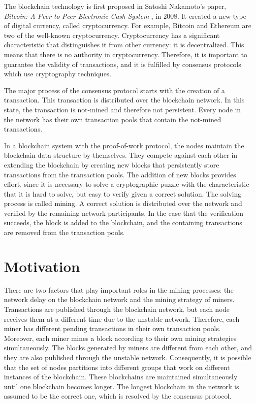 The blockchain technology is first proposed in Satoshi Nakamoto’s paper, \textit{Bitcoin: A Peer-to-Peer Electronic Cash System} \cite{Nakamoto2008}, in 2008. It created a new type of digital currency, called cryptocurrency. For example, Bitcoin \cite{bitcoin} and Ethereum \cite{ethereum} are two of the well-known cryptocurrency. Cryptocurrency has a significant characteristic that distinguishes it from other currency: it is decentralized. This means that there is no authority in cryptocurrency. Therefore, it is important to guarantee the validity of transactions, and it is fulfilled by consensus protocols which use cryptography techniques. \cite{Narayanan2016}

The major process of the consensus protocol starts with the creation of a transaction. This transaction is distributed over the blockchain network. In this state, the transaction is not-mined and therefore not persistent. Every node in the network has their own transaction pools that contain the not-mined transactions.

In a blockchain system with the proof-of-work protocol, the nodes maintain the blockchain data structure by themselves. They compete against each other in extending the blockchain by creating new blocks that persistently store transactions from the transaction pools. The addition of new blocks provides effort, since it is necessary to solve a cryptographic puzzle with the characteristic that it is hard to solve, but easy to verify given a correct solution. The solving process is called mining. A correct solution is distributed over the network and verified by the remaining network participants. In the case that the verification succeeds, the block is added to the blockchain, and the containing transactions are removed from the transaction pools.

\section{Motivation}

There are two factors that play important roles in the mining processes: the network delay on the blockchain network and the mining strategy of miners. Transactions are published through the blockchain network, but each node receives them at a different time due to the unstable network. Therefore, each miner has different pending transactions in their own transaction pools. Moreover, each miner mines a block according to their own mining strategies simultaneously. The blocks generated by miners are different from each other, and they are also published through the unstable network. Consequently, it is possible that the set of nodes partitions into different groups that work on different instances of the blockchain. These blockchains are maintained simultaneously until one blockchain becomes longer. The longest blockchain in the network is assumed to be the correct one, which is resolved by the consensus protocol.

